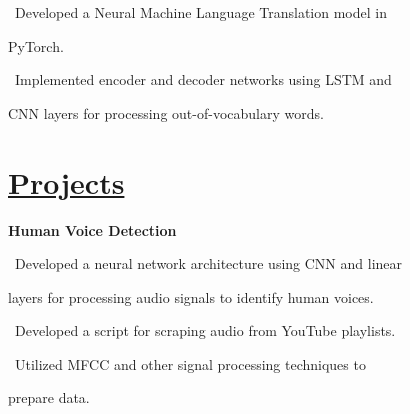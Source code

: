 \documentclass{article}
\begin{document}
\begin{minipage}[t]{0.45\textwidth\hspace{0in}}
\begin{minipage}[t]{3.75in\textwidth\hspace{0in}}
            \small\mdseries
            \vspace{0.21em}
            \hspace{eeeeeeeee1em}\textasteriskcentered \, \mdseries\textrm{Developed a Neural Machine Language Translation model in} 
            
            \hspace{1.7em} PyTorch.
            
            \vspace{0.2em}
            \hspace{1em}\textasteriskcentered \, \mdseries\textrm{Implemented encoder and decoder networks using LSTM and}
            
            \hspace{1.7em} CNN layers for processing out-of-vocabulary words.
        \end{minipage}

        \section{\underline{Projects}}
        \begin{minipage}[t]{3.75in\textwidth\hspace{0in}}
            \mdseries\bfseries{Human Voice Detection}            
            
            \vspace{0.6em}
            \small\mdseries
            \hspace{1em}\textasteriskcentered \, \mdseries\textrm{Developed a neural network architecture using CNN and linear} 
            
            \hspace{2em}layers for processing audio signals to identify human voices.

            \vspace{0.6em}
            \hspace{1em}\textasteriskcentered \, \mdseries\textrm{Developed a script for scraping audio from YouTube playlists.}
            
            \vspace{0.6em}
            \hspace{1em}\textasteriskcentered \, \mdseries\textrm{Utilized MFCC and other signal processing techniques to} 
            
            \hspace{1.7em} prepare data.

        \end{minipage}

\end{minipage}
\end{document}
